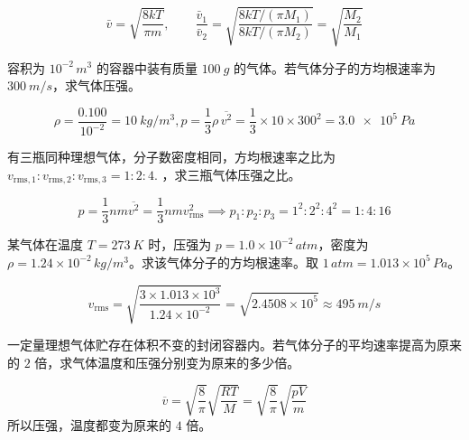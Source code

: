 \begin{solution}
 \[\bar v=\sqrt{\frac{8kT}{\pi m}},\qquad \frac{\bar v_1}{\bar v_2} =\sqrt{\frac{8kT/(\pi M_1)}{8kT/(\pi M_2)}} =\sqrt{\frac{M_2}{M_1}}\] 
\end{solution}

\begin{exercise}
容积为 \(10^{-2}\,\si{m^3}\) 的容器中装有质量 \(\SI{100}{g}\) 的气体。若气体分子的方均根速率为 \(\SI{300}{m/s}\)，求气体压强。
\end{exercise}

\begin{solution}
 \[\rho=\frac{0.100}{10^{-2}}=\SI{10}{kg/m^3},p=\frac13\rho\,\overline{v^2}=\frac13\times 10\times 300^2 =\SI{3.0e5}{Pa}\]
\end{solution}

\begin{exercise}
有三瓶同种理想气体，分子数密度相同，方均根速率之比为 \(v_{\mathrm{rms},1}:v_{\mathrm{rms},2}:v_{\mathrm{rms},3}=1:2:4.\) ，求三瓶气体压强之比。
\end{exercise}

\begin{solution}
 \[p=\frac13 nm\overline{v^2} =\frac13nmv_{\mathrm{rms}}^2\implies p_1:p_2:p_3 =1^2:2^2:4^2 =1:4:16\]
\end{solution}

\begin{exercise}
某气体在温度 \(T=\SI{273}{K}\) 时，压强为 \(p=1.0\times10^{-2}\,\si{atm}\)，密度为 \(\rho=1.24\times10^{-2}\,\si{kg/m^3}\)。求该气体分子的方均根速率。取 \(1\,\si{atm}=1.013\times10^5\,\si{Pa}\)。
\end{exercise}

\begin{solution}
\[v_{\mathrm{rms}} =\sqrt{\frac{3\times1.013\times10^3}{1.24\times10^{-2}}} =\sqrt{2.4508\times10^5} \approx \SI{495}{m/s}\]
\end{solution}

\begin{exercise}
一定量理想气体贮存在体积不变的封闭容器内。若气体分子的平均速率提高为原来的 \(2\) 倍，求气体温度和压强分别变为原来的多少倍。
\end{exercise}

\begin{solution}
\[\overline{v}=\sqrt{\frac{8}{\pi}}\sqrt{\frac{RT}{M}}=\sqrt{\frac{8}{\pi}}\sqrt{\frac{pV}{m}}\]
 所以压强，温度都变为原来的 \(4\) 倍。
\end{solution}


